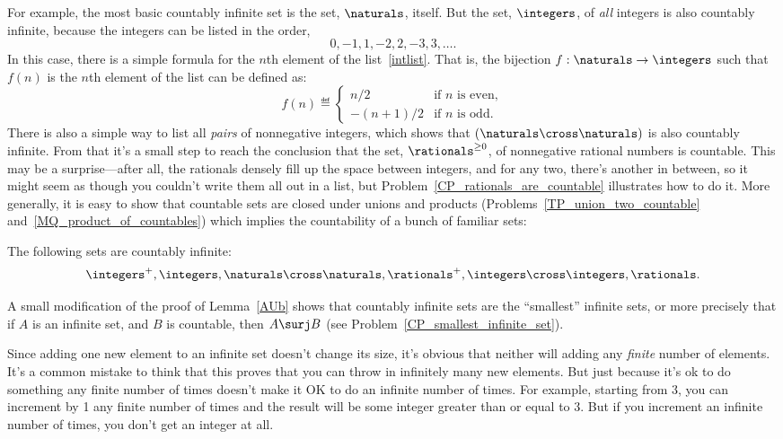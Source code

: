 For example, the most basic countably infinite set is the set,
$\naturals$, itself.  But the set, $\integers$, of \emph{all} integers
is also countably infinite, because the integers can be listed in the
order,
\begin{equation}\label{intlist}
0,-1,1,-2,2,-3,3,\dots.
\end{equation}
In this case, there is a simple formula for the $n$th element of the
list~\eqref{intlist}.  That is, the bijection $f:\naturals \to
\integers$ such that $f(n)$ is the $n$th element of the list can be
defined as:
\[
f(n) \eqdef \begin{cases} n/2 & \text{if $n$ is even},\\ -(n+1)/2 &
  \text{if $n$ is odd}.
           \end{cases} 
\]    
There is also a simple way to list all \emph{pairs} of nonnegative
integers, which shows that $(\naturals \cross \naturals)$ is also
countably infinite.  From that it's a small step to reach the
conclusion that the set, $\rationals^{\ge 0}$, of nonnegative rational
numbers is countable.  This may be a surprise---after all, the
rationals densely fill up the space between integers, and for any two,
there's another in between, so it might seem as though you couldn't
write them all out in a list, but
Problem~\ref{CP_rationals_are_countable} illustrates how to do it.
More generally, it is easy to show that countable sets are closed
under unions and products (Problems~\ref{TP_union_two_countable}
and~\ref{MQ_product_of_countables}) which implies the countability of
a bunch of familiar sets:
\begin{corollary}\label{countable_examples}
The following sets are countably infinite:
\[\integers^+, 
 \integers, \naturals \cross \naturals, \rationals^+, \integers \cross
 \integers, \rationals.
\]
\end{corollary}

A small modification of the proof of Lemma~\ref{AUb} shows that
countably infinite sets are the ``smallest'' infinite sets, or more
precisely that if $A$ is an infinite set, and $B$ is countable, then
$A \surj B$ (see Problem~\ref{CP_smallest_infinite_set}).

Since adding one new element to an infinite set doesn't change its
size, it's obvious that neither will adding any \emph{finite} number
of elements.  It's a common mistake to think that this proves that you
can throw in infinitely many new elements.  But just because it's ok
to do something any finite number of times doesn't make it OK to do an
infinite number of times.  For example, starting from 3, you can
increment by 1 any finite number of times and the result will be some
integer greater than or equal to 3.  But if you increment an infinite
number of times, you don't get an integer at all.


